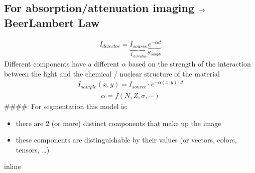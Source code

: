 \documentclass[letterpaper,10pt,english]{sphinxmanual}
\begin{document}
\subsection{For absorption/attenuation imaging \protect\(\rightarrow\protect\) Beer\sphinxhyphen{}Lambert Law}
\label{\detokenize{04-BasicSegmentation:for-absorption-attenuation-imaging-rightarrow-beer-lambert-law}}\begin{equation*}
\begin{split}I_{detector}=\underbrace{I_{source}}_{I_{stimulus}}\underbrace{e^{-\alpha d}}_{S_{sample}}\end{split}
\end{equation*}
\sphinxAtStartPar
Different components have a different \(\alpha\) based on the strength of the interaction between the light and the chemical / nuclear structure of the material
\begin{equation*}
\begin{split}I_{sample}(x,y)=I_{source}\cdot{}e^{-\alpha(x,y)\cdot{}d}\end{split}
\end{equation*}\begin{equation*}
\begin{split}\alpha=f(N,Z,\sigma,\cdots)\end{split}
\end{equation*}
\sphinxAtStartPar
\#\#\#\# For segmentation this model is:
\begin{itemize}
\item {} 
\sphinxAtStartPar
there are 2 (or more) distinct components that make up the image

\item {} 
\sphinxAtStartPar
these components are distinguishable by their values (or vectors, colors, tensors, …)

\end{itemize}

\begin{sphinxVerbatim}[commandchars=\\\{\}]
 inline
   
   
   
\end{sphinxVerbatim}
\end{document}
